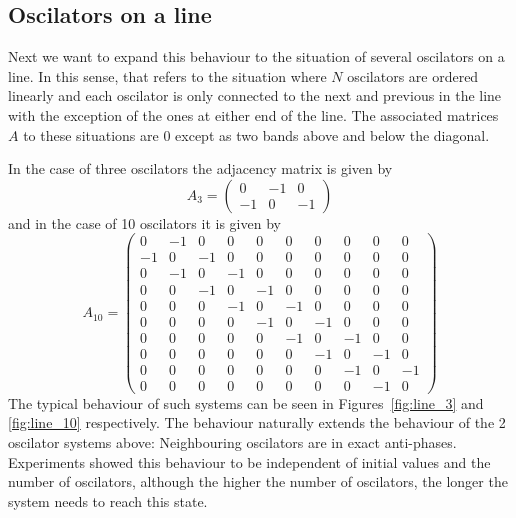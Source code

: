 \subsection{Oscilators on a line}

Next we want to expand this behaviour to the situation of several oscilators on a line. In this sense, that refers to the situation where $N$ oscilators are ordered linearly and each oscilator is only connected to the next and previous in the line with the exception of the ones at either end of the line. The associated matrices $A$ to these situations are $0$ except as two bands above and below the diagonal.  

In the case of three oscilators the adjacency matrix is given by
\[
  A_3 = \left( \begin{array}{ccc}
  0  & -1 &  0\\ 
  -1 &  0 & -1
  \end{array} \right)
\] 
and in the case of 10 oscilators it is given by
\[
  A_{10} = \left( \begin{array}{cccccccccc}
  0 & -1 & 0 & 0 & 0 & 0 & 0 & 0 & 0 & 0 \\
  -1 & 0 & -1 & 0 & 0 & 0 & 0 & 0 & 0 & 0 \\
  0 & -1 & 0 & -1 & 0 & 0 & 0 & 0 & 0 & 0 \\
  0 & 0 & -1 & 0 & -1 & 0 & 0 & 0 & 0 & 0 \\
  0 & 0 & 0 & -1 & 0 & -1 & 0 & 0 & 0 & 0 \\
  0 & 0 & 0 & 0 & -1 & 0 & -1 & 0 & 0 & 0 \\
  0 & 0 & 0 & 0 & 0 & -1 & 0 & -1 & 0 & 0 \\
  0 & 0 & 0 & 0 & 0 & 0 & -1 & 0 & -1 & 0 \\
  0 & 0 & 0 & 0 & 0 & 0 & 0 & -1 & 0 & -1 \\
  0 & 0 & 0 & 0 & 0 & 0 & 0 & 0 & -1 & 0
  \end{array} \right)
\]
The typical behaviour of such systems can be seen in Figures~\ref{fig:line_3} and \ref{fig:line_10} respectively. The behaviour naturally extends the behaviour of the 2 oscilator systems above: Neighbouring oscilators are in exact anti-phases. Experiments showed this behaviour to be independent of initial values and the number of oscilators, although the higher the number of oscilators, the longer the system needs to reach this state. 

